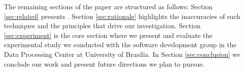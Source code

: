 
The remaining sections of the paper are structured as follows: Section \ref{sec:related} presents . Section \ref{sec:rationale} highlights the inaccuracies of such techniques and the principles that drive our investigation. Section \ref{sec:experiment} is the core section where we present and evaluate the experimental study we conducted with the software development group in the Data Processing Center at University of Brasilia. In Section \ref{sec:conclusion} we conclude our work and present future directions we plan to pursue.

